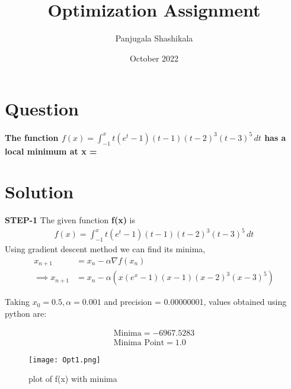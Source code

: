 \documentclass[journal,10pt,twocolumn]{article}
\title{\textbf{Optimization Assignment}}
\author{Panjugala Shashikala}
\date{October 2022}
\providecommand{\brak}[1]{\ensuremath{\left(#1\right)}}
\begin{document}
\maketitle
\section{Question}
\textbf{The function 
 $f(x)=\int_{-1}^{x}t(e^t-1)(t-1)(t-2)^3(t-3)^5 \,dt$  has a local minimum at x = }

 \section{Solution}
 \textbf{STEP-1}
 The given function \textbf{f(x)} is
 \begin{align}
 f(x)=\int_{-1}^{x}t(e^t-1)(t-1)(t-2)^3(t-3)^5 \,dt 
 \end{align}
Using gradient descent method we can find its minima,
    \begin{align}
        x_{n+1} &= x_n - \alpha \nabla f(x_n) \\
        \implies x_{n+1} &= x_n - \alpha \brak{x(e^x-1)(x-1)(x-2)^3(x-3)^5}
    \end{align}
    
Taking $x_0=0.5,\alpha=0.001$ and precision = 0.00000001, values obtained using python are:
    
    \begin{align}
        \boxed{\text{Minima} = -6967.5283 }\\
        \boxed{\text{Minima Point} = 1.0 }
    \end{align}
    
    
\begin{figure}[h!]
\centering
\texttt{[image: Opt1.png]}  \\
\caption{plot of f(x) with minima}
\end{figure}
\end{document}
